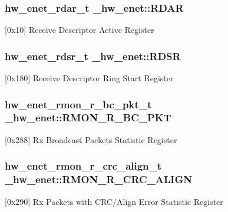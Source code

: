 \subsubsection[{\texorpdfstring{R\+D\+AR}{RDAR}}]{ {\bf hw\+\_\+enet\+\_\+rdar\+\_\+t} \+\_\+hw\+\_\+enet\+::\+R\+D\+AR}\hypertarget{struct__hw__enet_a3e45cbe4fcc3c5d639c3beba27c33e57}{}\label{struct__hw__enet_a3e45cbe4fcc3c5d639c3beba27c33e57}
\mbox{[}0x10\mbox{]} Receive Descriptor Active Register 
\subsubsection[{\texorpdfstring{R\+D\+SR}{RDSR}}]{ {\bf hw\+\_\+enet\+\_\+rdsr\+\_\+t} \+\_\+hw\+\_\+enet\+::\+R\+D\+SR}\hypertarget{struct__hw__enet_a0540397177c1f12df291941c12a2ed85}{}\label{struct__hw__enet_a0540397177c1f12df291941c12a2ed85}
\mbox{[}0x180\mbox{]} Receive Descriptor Ring Start Register 
\subsubsection[{\texorpdfstring{R\+M\+O\+N\+\_\+\+R\+\_\+\+B\+C\+\_\+\+P\+KT}{RMON_R_BC_PKT}}]{ {\bf hw\+\_\+enet\+\_\+rmon\+\_\+r\+\_\+bc\+\_\+pkt\+\_\+t} \+\_\+hw\+\_\+enet\+::\+R\+M\+O\+N\+\_\+\+R\+\_\+\+B\+C\+\_\+\+P\+KT}\hypertarget{struct__hw__enet_ab336e389bf00fbd039ed91f18dcd2162}{}\label{struct__hw__enet_ab336e389bf00fbd039ed91f18dcd2162}
\mbox{[}0x288\mbox{]} Rx Broadcast Packets Statistic Register 
\subsubsection[{\texorpdfstring{R\+M\+O\+N\+\_\+\+R\+\_\+\+C\+R\+C\+\_\+\+A\+L\+I\+GN}{RMON_R_CRC_ALIGN}}]{ {\bf hw\+\_\+enet\+\_\+rmon\+\_\+r\+\_\+crc\+\_\+align\+\_\+t} \+\_\+hw\+\_\+enet\+::\+R\+M\+O\+N\+\_\+\+R\+\_\+\+C\+R\+C\+\_\+\+A\+L\+I\+GN}\hypertarget{struct__hw__enet_a5c2104be78b9aa53b014c7c50b10443a}{}\label{struct__hw__enet_a5c2104be78b9aa53b014c7c50b10443a}
\mbox{[}0x290\mbox{]} Rx Packets with C\+R\+C/\+Align Error Statistic Register 
